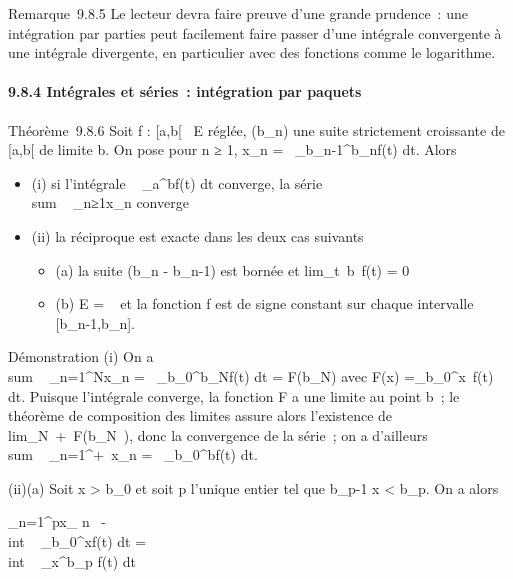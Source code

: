 \documentclass[]{article}
\begin{document}
Remarque~9.8.5 Le lecteur devra faire preuve d'une grande prudence~: une
intégration par parties peut facilement faire passer d'une intégrale
convergente à une intégrale divergente, en particulier avec des
fonctions comme le logarithme.

\paragraph{9.8.4 Intégrales et séries~: intégration par paquets}

Théorème~9.8.6 Soit f : {[}a,b{[}\rightarrow~ E réglée, (b\_n) une suite
strictement croissante de {[}a,b{[} de limite b. On pose pour n ≥ 1,
x\_n =\int ~
\_b\_n-1^b\_nf(t) dt. Alors

\begin{itemize}
\itemsep1pt\parskip0pt
\item
  (i) si l'intégrale \int ~
  \_a^bf(t) dt converge, la série
  \\sum ~
  \_n≥1x\_n converge
\item
  (ii) la réciproque est exacte dans les deux cas suivants

  \begin{itemize}
  \itemsep1pt\parskip0pt
  \item
    (a) la suite (b\_n - b\_n-1) est bornée et
    lim\_t\rightarrow~b~f(t) = 0
  \item
    (b) E = ~ et la fonction f est de signe constant sur chaque
    intervalle {[}b\_n-1,b\_n{]}.
  \end{itemize}
\end{itemize}

Démonstration (i) On a
\\sum ~
\_n=1^Nx\_n =\int ~
\_b\_0^b\_Nf(t) dt = F(b\_N) avec
F(x) =\int  \_b\_0^x~f(t)
dt. Puisque l'intégrale converge, la fonction F a une limite au point
b~; le théorème de composition des limites assure alors l'existence de
lim\_N\rightarrow~+\infty~F(b\_N~), donc la
convergence de la série~; on a d'ailleurs
\\sum ~
\_n=1^+\infty~x\_n =\int ~
\_b\_0^bf(t) dt.

(ii)(a) Soit x \textgreater{} b\_0 et soit p l'unique entier tel
que b\_p-1 \leq x \textless{} b\_p. On a alors

\sum \_n=1^px\_ n~
-\\int  ~
\_b\_0^xf(t) dt =
\\int  ~
\_x^b\_p f(t) dt
\end{document}
